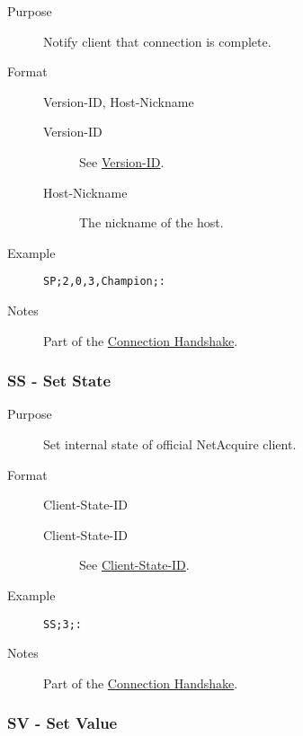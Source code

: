 \documentclass{article}
\providecommand{\wiredata}[1]{\texttt{{#1}}}
\begin{document}
\begin{description}
  \item[Purpose] Notify client that connection is complete.
  \item[Format] Version-ID, Host-Nickname
  \begin{description}
    \item[Version-ID] See \hyperref[ssub:version_id]{Version-ID}.
    \item[Host-Nickname] The nickname of the host.
  \end{description}
  \item[Example] \wiredata{SP;2,0,3,Champion;:}
  \item[Notes] Part of the \hyperref[sub:connection_handshake]{Connection Handshake}.
\end{description}


\subsubsection{SS - Set State} %
\label{ssub:ss_set_state}

\begin{description}
  \item[Purpose] Set internal state of official NetAcquire client.
  \item[Format] Client-State-ID
  \begin{description}
    \item[Client-State-ID] See \hyperref[ssub:client_state_id]{Client-State-ID}.
  \end{description}
  \item[Example] \wiredata{SS;3;:}
  \item[Notes] Part of the \hyperref[sub:connection_handshake]{Connection Handshake}.
\end{description}


\subsubsection{SV - Set Value} %
\label{ssub:sv_set_value}
\end{document}
